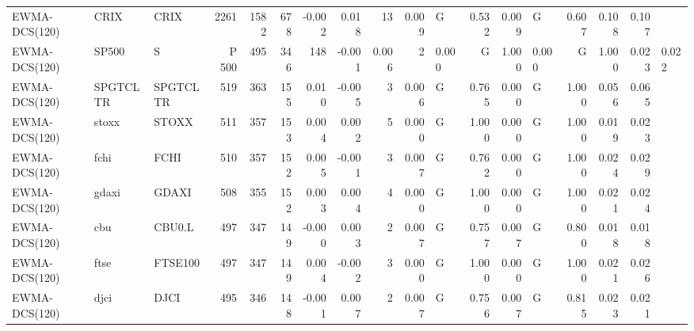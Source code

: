 \begin{table}[H]
\begin{tabular}{lllrrrrrrrlrrlrrr}
EWMA-DCS(120) & CRIX & CRIX & 2261 & 1582 & 678 & -0.002 & 0.018 & 13 & 0.009 & G & 0.532 & 0.009 & G & 0.607 & 0.108 & 0.107 \\
EWMA-DCS(120) & SP500 & S&P 500 & 495 & 346 & 148 & -0.001 & 0.006 & 2 & 0.000 & G & 1.000 & 0.000 & G & 1.000 & 0.023 & 0.022 \\
EWMA-DCS(120) & SPGTCLTR & SPGTCLTR & 519 & 363 & 155 & 0.010 & -0.005 & 3 & 0.006 & G & 0.765 & 0.000 & G & 1.000 & 0.056 & 0.065 \\
EWMA-DCS(120) & stoxx & STOXX & 511 & 357 & 153 & 0.004 & 0.002 & 5 & 0.000 & G & 1.000 & 0.000 & G & 1.000 & 0.019 & 0.023 \\
EWMA-DCS(120) & fchi & FCHI & 510 & 357 & 152 & 0.005 & -0.001 & 3 & 0.007 & G & 0.762 & 0.000 & G & 1.000 & 0.024 & 0.029 \\
EWMA-DCS(120) & gdaxi & GDAXI & 508 & 355 & 152 & 0.003 & 0.004 & 4 & 0.000 & G & 1.000 & 0.000 & G & 1.000 & 0.021 & 0.024 \\
EWMA-DCS(120) & cbu & CBU0.L & 497 & 347 & 149 & -0.000 & 0.003 & 2 & 0.007 & G & 0.757 & 0.007 & G & 0.800 & 0.018 & 0.018 \\
EWMA-DCS(120) & ftse & FTSE100 & 497 & 347 & 149 & 0.004 & -0.002 & 3 & 0.000 & G & 1.000 & 0.000 & G & 1.000 & 0.021 & 0.026 \\
EWMA-DCS(120) & djci & DJCI & 495 & 346 & 148 & -0.001 & 0.007 & 2 & 0.007 & G & 0.756 & 0.007 & G & 0.815 & 0.023 & 0.021 \\
\bottomrule
\end{tabular}
\end{table}
